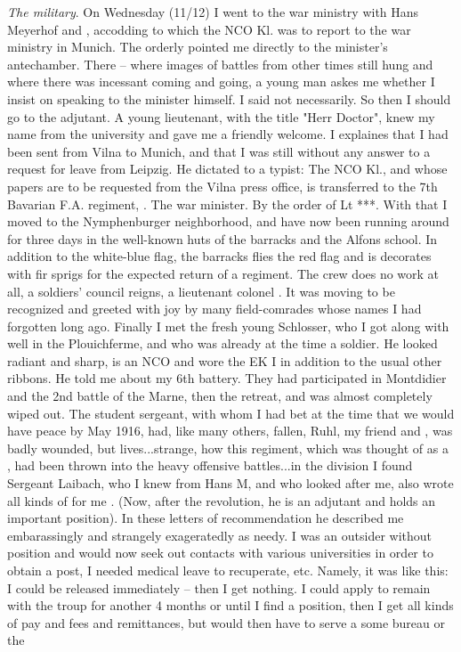 \textit{The military}. On Wednesday (11/12) I went to the war ministry with Hans Meyerhof and , accodding to which the NCO Kl. was to report to the war ministry in Munich. The orderly pointed me directly to the minister's antechamber. There -- where images of battles from other times still hung and where there was incessant coming and going, a young man askes me whether I insist on speaking to the minister himself. I said not necessarily. So then I should go to the adjutant. A young lieutenant, with the title "Herr Doctor", knew my name from the university and gave me a friendly welcome. I explaines that I had been sent from Vilna to Munich, and that I was still without any answer to a request for leave from Leipzig. He dictated to a typist: The NCO Kl.,  and whose papers are to be requested from the Vilna press office, is transferred to the 7th Bavarian F.A. regiment, . The war minister. By the order of Lt ***. With that I moved to the Nymphenburger neighborhood, and have now been running around for three days in the well-known huts of the barracks and the Alfons school. In addition to the white-blue flag, the barracks flies the red flag and is decorates with fir sprigs for the expected return of a regiment. The crew does no work at all, a soldiers' council reigns, a lieutenant colonel . It was moving to be recognized and greeted with joy by many field-comrades whose names I had forgotten long ago. Finally I met the fresh young Schlosser, who I got along with well in the Plouichferme, and who was already at the time a  soldier. He looked radiant and sharp, is an NCO and wore the EK I in addition to the usual other ribbons. He told me about my 6th battery. They had participated in Montdidier and the 2nd battle of the Marne, then the retreat, and was almost completely wiped out. The student sergeant, with whom I had bet at the time that we would have peace by May 1916, had, like many others, fallen, Ruhl, my friend and , was badly wounded, but lives...strange, how this regiment, which was thought of as a , had been thrown into the heavy offensive battles...in the division I found Sergeant Laibach, who I knew from Hans M, and who looked after me, also wrote all kinds of  for me . (Now, after the revolution, he is an adjutant and holds an important position). In these letters of recommendation he described me embarassingly and strangely exageratedly as needy. I was an outsider without position and would now seek out contacts with various universities in order to obtain a post, I needed medical leave to recuperate, etc. Namely, it was like this: I could be released immediately -- then I get nothing. I could apply to remain with the troup for another 4 months or until I find a position, then I get all kinds of pay and fees and remittances, but would then have to serve a some bureau or the 